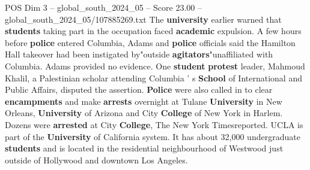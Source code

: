 \begin{textsample}{POS Dim 3 – global\_south\_2024\_05 – Score 23.00 – global\_south\_2024\_05/107885269.txt}
The \textbf{university} earlier warned that \textbf{students} taking part in the occupation faced \textbf{academic} expulsion.
A few hours before \textbf{police} entered Columbia, Adams and \textbf{police} officials said the Hamilton Hall takeover had been instigated by"outside \textbf{agitators}"unaffiliated with Columbia.
Adams provided no evidence.
One \textbf{student} \textbf{protest} leader, Mahmoud Khalil, a Palestinian scholar attending Columbia ' s \textbf{School} of International and Public Affairs, disputed the assertion. \textbf{Police} were also called in to clear \textbf{encampments} and make \textbf{arrests} overnight at Tulane \textbf{University} in New Orleans, \textbf{University} of Arizona and City \textbf{College} of New York in Harlem.
Dozens were \textbf{arrested} at City \textbf{College}, The New York Timesreported.
UCLA is part of the \textbf{University} of California system.
It has about 32,000 undergraduate \textbf{students} and is located in the residential neighbourhood of Westwood just outside of Hollywood and downtown Los Angeles.

\end{textsample}
